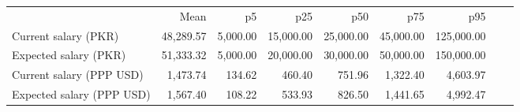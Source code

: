 \begin{tabular}{lrrrrrrrr}


\toprule


                    &        Mean&          p5&         p25&         p50&         p75&         p95\\

Current salary (PKR)&   48,289.57&    5,000.00&   15,000.00&   25,000.00&   45,000.00&  125,000.00\\
Expected salary (PKR)&   51,333.32&    5,000.00&   20,000.00&   30,000.00&   50,000.00&  150,000.00\\
Current salary (PPP USD)&    1,473.74&      134.62&      460.40&      751.96&    1,322.40&    4,603.97\\
Expected salary (PPP USD)&    1,567.40&      108.22&      533.93&      826.50&    1,441.65&    4,992.47\\
\bottomrule


\end{tabular}


